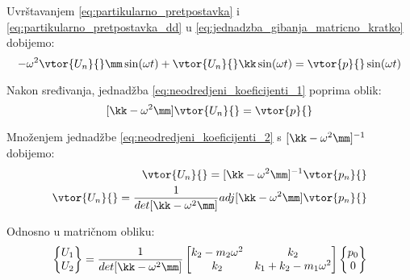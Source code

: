 Uvrštavanjem \eqref{eq:partikularno_pretpostavka} i \eqref{eq:partikularno_pretpostavka_dd}
u \eqref{eq:jednadzba_gibanja_matricno_kratko} dobijemo:
\begin{equation}\label{eq:neodredjeni_koeficijenti_1}
    -\omega^2\vtor{U_n}{}\mm\sin(\omega t) 
    +
    \vtor{U_n}{}\kk\sin(\omega t)
    =
    \vtor{p}{}\sin(\omega t)
\end{equation}

Nakon sređivanja, jednadžba \eqref{eq:neodredjeni_koeficijenti_1} poprima oblik:
\begin{equation}\label{eq:neodredjeni_koeficijenti_2}
    [\kk-\omega^2\mm]\vtor{U_n}{}=\vtor{p}{}
\end{equation}

%

Množenjem jednadžbe \eqref{eq:neodredjeni_koeficijenti_2} s $[\kk-\omega^2\mm]^{-1}$
dobijemo:
\begin{equation}
    \begin{split}
        \vtor{U_n}{}=[\kk-\omega^2\mm]^{-1}\vtor{p_n}{} \notag\\
        \vtor{U_n}{}=\frac{1}{det[\kk-\omega^2\mm]}adj[\kk-\omega^2\mm]\vtor{p_n}{}\label{eqneodredjeni_koeficijenti_3}
    \end{split}
\end{equation}

Odnosno u matričnom obliku:
\begin{equation}
    \begin{Bmatrix}
        U_1\\
        U_2
    \end{Bmatrix}
    =
    \frac{1}{det[\kk-\omega^2\mm]}
        \begin{bmatrix}
            k_2-m_2\omega^2 & k_2\\
            k_2 & k_1+k_2-m_1\omega^2
        \end{bmatrix}
        \begin{Bmatrix}
            p_0\\
            0
        \end{Bmatrix}
\end{equation}

